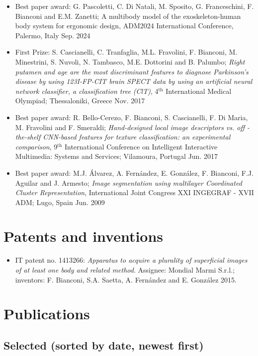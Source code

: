\documentclass[11pt]{article}
\begin{document}
\begin{itemize}
	\item Best paper award: G. Pascoletti, C. Di Natali, M. Sposito, G. Franceschini, F. Bianconi and E.M. Zanetti; A multibody model of the exoskeleton-human body system for ergonomic design, ADM2024 International Conference, Palermo, Italy \hfill Sep. 2024
  \item First Prize: S. Cascianelli, C. Tranfaglia, M.L. Fravolini, F. Bianconi, M. Minestrini, S. Nuvoli, N. Tambasco, M.E. Dottorini and B. Palumbo; \emph{Right putamen and age are the most discriminant features to diagnose Parkinson's disease by using 123I-FP-CIT brain SPECT data by using an artificial neural network classifier, a classification tree (ClT)}, 4$^\text{th}$ International Medical Olympiad; Thessaloniki, Greece \hfill Nov. 2017
	\item Best paper award: R. Bello-Cerezo, F. Bianconi, S. Cascianelli, F. Di Maria, M. Fravolini and F. Smeraldi; \emph{Hand-designed local image descriptors vs. off -the-shelf CNN-based features for texture classification: an experimental comparison}, 9$^\text{th}$ International Conference on Intelligent Interactive Multimedia: Systems and Services; Vilamoura, Portugal \hfill Jun. 2017
	\item Best paper award: M.J. Álvarez, A. Fernández, E. González, F. Bianconi, F.J. Aguilar and J. Armesto; \emph{Image segmentation using multilayer Coordinated Cluster Representation}, International Joint Congress XXI INGEGRAF - XVII ADM; Lugo, Spain \hfill Jun. 2009
\end{itemize}

\section*{Patents and inventions}

\begin{itemize}
	\item IT patent no. 1413266: \emph{Apparatus to acquire a plurality of superficial images of at least one body and related method}. Assignee: Mondial Marmi S.r.l.; inventors: F. Bianconi, S.A. Saetta, A. Fernández and E. González \hfill 2015.
\end{itemize}

\section*{Publications} 

\subsection*{Selected (sorted by date, newest first)}
\end{document}
